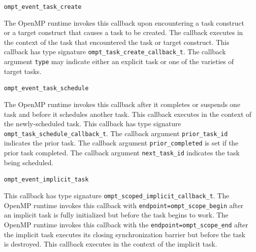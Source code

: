 \documentclass{article}
\newcommand{\descheader}[1]{{\needspace{3\baselineskip}\vspace{1em}\noindent \fbox{#1}}}
\begin{document}
\begin{description}

\item \verb|ompt_event_task_create|
 
The OpenMP runtime invokes this callback
upon encountering a task construct or a target construct that causes a task to be created. 
The callback executes in the context of
the task that encountered the task or target construct.
This callback has type signature \verb|ompt_task_create_callback_t|.
The callback argument \verb|type| may indicate either an explicit task or one of the varieties of target tasks.

\item \verb|ompt_event_task_schedule|

 The OpenMP runtime invokes this callback after it
 completes or suspends one task and before it schedules another task.  This
 callback executes in the context of the newly-scheduled task.  
   This callback has type signature \verb|ompt_task_schedule_callback_t|. 
  The callback argument \verb|prior_task_id| indicates the prior task.
  The callback argument \verb|prior_completed| is set if the prior task completed.
  The callback argument \verb|next_task_id| indicates the task being scheduled. 

\item \verb|ompt_event_implicit_task|

     This callback has type signature \verb|ompt_scoped_implicit_callback_t|. 
      The OpenMP runtime invokes this callback with \verb|endpoint=|\verb|ompt_scope_begin| after an
   implicit task is fully initialized but before the task begins to work.
   The OpenMP runtime invokes this callback with the \verb|endpoint=|\verb|ompt_scope_end| after the implicit
   task executes its closing synchronization barrier but before
   the task is destroyed.
   This callback executes in the context of the implicit task.
   
\end{description}

\descheader{Target Regions}
\end{document}
